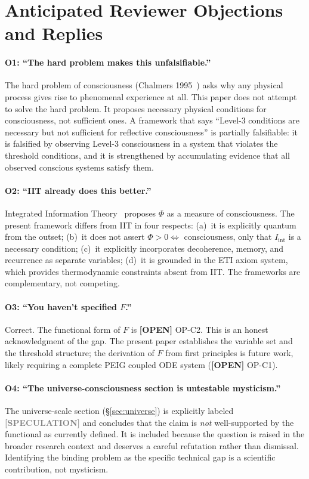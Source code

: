 \documentclass[12pt,letterpaper]{article}
\newcommand{\OPEN}[1]{\textcolor{red!70!black}{\textbf{[OPEN]}} #1}
\newcommand{\SPECULATION}[1]{\textcolor{gray}{\textbf{[SPECULATION]}} #1}
\newcommand{\Iint}{I_{\mathrm{int}}}
\begin{document}
\section{Anticipated Reviewer Objections and Replies}
\label{sec:objections}

\paragraph{O1: ``The hard problem makes this unfalsifiable.''}
The hard problem of consciousness (Chalmers 1995~\cite{Chalmers1995}) asks
why any physical process gives rise to phenomenal experience at all. This
paper does not attempt to solve the hard problem. It proposes necessary physical
conditions for consciousness, not sufficient ones. A framework that says
``Level-3 conditions are necessary but not sufficient for reflective consciousness''
is partially falsifiable: it is falsified by observing Level-3 consciousness in a
system that violates the threshold conditions, and it is strengthened by
accumulating evidence that all observed conscious systems satisfy them.

\paragraph{O2: ``IIT already does this better.''}
Integrated Information Theory~\cite{Tononi2004} proposes $\Phi$ as a measure
of consciousness. The present framework differs from IIT in four respects:
(a)~it is explicitly quantum from the outset; (b)~it does not assert
$\Phi > 0 \Leftrightarrow$ consciousness, only that $\Iint$ is a necessary
condition; (c)~it explicitly incorporates decoherence, memory, and recurrence
as separate variables; (d)~it is grounded in the ETI axiom system, which
provides thermodynamic constraints absent from IIT. The frameworks are
complementary, not competing.

\paragraph{O3: ``You haven't specified $F$.''}
Correct. The functional form of $F$ is \OPEN{OP-C2}. This is an honest
acknowledgment of the gap. The present paper establishes the variable set
and the threshold structure; the derivation of $F$ from first principles
is future work, likely requiring a complete PEIG coupled ODE system
(\OPEN{OP-C1}).

\paragraph{O4: ``The universe-consciousness section is untestable mysticism.''}
The universe-scale section (\S\ref{sec:universe}) is explicitly labeled
\SPECULATION{} and concludes that the claim is \emph{not} well-supported
by the functional as currently defined. It is included because the
question is raised in the broader research context and deserves a careful
refutation rather than dismissal. Identifying the binding problem as the
specific technical gap is a scientific contribution, not mysticism.
\end{document}
